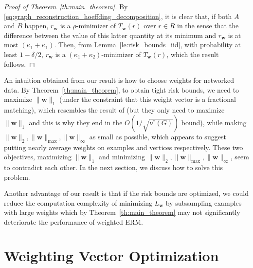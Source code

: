 \documentclass[letterpaper]{article} %
\def\LongVersion{}
\def\LongVersionEnd{}
\newcommand{\weight}{\mathbf{w}}
\newcommand{\empiricalrisk}[1]{L_{#1}}
\newcommand{\normo}[1]{\|#1\|_1}
\newcommand{\red}[1]{\textcolor{red}{#1}}
\newcommand{\todo}[1]{\red{\textsc{todo:} #1}}
\begin{document}
\begin{proof}[Proof of Theorem~\ref{th:main_theorem}]
    By \eqref{eq:graph_reconstruction_hoeffding_decomposition}, it is clear that, if both $A$ and $B$ happen,
    $r_\weight{}$ is a $\rho$-minimizer of $T_\weight{}(r)$ over $r\in R$ in the sense that the difference between the value of this latter quantity at its minimum and $r_\weight{}$ is at most $(\kappa_1+\kappa_1)$.
    Then, from Lemma~\ref{le:risk_bounds_iid}, with probability at least $1-\delta/2$, $r_\weight{}$ is a $(\kappa_1+\kappa_2)$-minimizer of $T_\weight{}(r)$, which the result follows. 
\end{proof}

An intuition obtained from our result is how to choose weights for networked data. By Theorem~\ref{th:main_theorem}, to obtain tight risk bounds, we need to maximize $\normo{\weight{}}$ (under the constraint that this weight vector is a fractional matching), which resembles the result of \cite{wang2017learning} (but they only need to maximize $\normo{\weight{}}$ and this is why they end in the $O(1/\sqrt{\nu^*(G)})$ bound), while making $\|\weight{}\|_2,\|\weight{}\|_\max,\|\weight{}\|_\infty$ as small as possible, which appears to suggest putting nearly average weights on examples and vertices respectively. These two objectives, maximizing $\normo{\weight{}}$ and minimizing $\|\weight{}\|_2,\|\weight{}\|_\max,\|\weight{}\|_\infty$, seem to contradict each other. 
In the next section, we discuss how to solve this problem.  


\LongVersion
Another advantage of our result is that if the risk bounds are optimized, we could reduce the computation complexity of minimizing $\empiricalrisk{\weight{}}$ by subsampling examples with large weights which by Theorem~\ref{th:main_theorem} may not significantly deteriorate the performance of weighted ERM.
\LongVersionEnd

\section{Weighting Vector Optimization} %
\label{sec:weighting_scheme}
\end{document}
